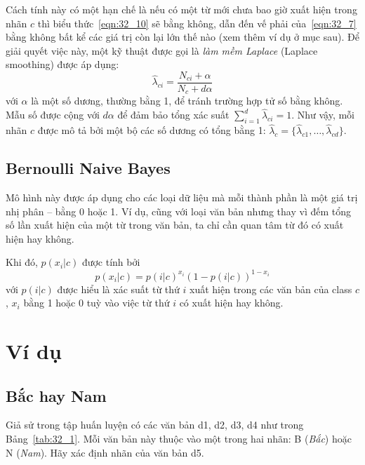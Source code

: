 Cách tính này có một hạn chế là nếu có một từ mới chưa bao giờ xuất hiện trong
nhãn $c$ thì biểu thức~\eqref{eqn:32_10} sẽ bằng không, dẫn đến vế phải
của~\eqref{eqn:32_7} bằng không bất kể các giá trị còn lại lớn thế nào (xem
thêm ví dụ ở mục sau). Để giải quyết việc này, một kỹ thuật được gọi là 
\textit{làm mềm Laplace} (Laplace smoothing) được áp dụng:
\begin{equation} 
\label{eqn:32_11}
\hat{\lambda}_{ci} = \frac{N_{ci} + \alpha}{N_{c} + d\alpha}
\end{equation} 
với $\alpha$ là một số dương, thường bằng 1, để tránh trường hợp tử số bằng
không. Mẫu số được cộng với $d\alpha$ để đảm bảo tổng xác suất $\sum_{i=1}^d
\hat{\lambda}_{ci} = 1$.
 Như vậy, mỗi nhãn $c$ được mô tả bởi một bộ các số dương có tổng bằng 1: $\hat{\lambda}_c = \{\hat{\lambda}_{c1}, \dots, \hat{\lambda}_{cd}\}$.
 
 
\subsection{Bernoulli Naive Bayes }
 
Mô hình này được áp dụng cho các loại dữ liệu mà mỗi thành phần là một giá trị
nhị phân -- bằng 0 hoặc 1. Ví dụ, cũng với loại văn bản nhưng thay vì đếm tổng
số lần xuất hiện của một từ trong văn bản, ta chỉ cần quan tâm từ đó có xuất
hiện hay không.
 
Khi đó, $p(x_i | c) $ được tính bởi
\begin{equation} 
p(x_i | c) = p(i | c)^{x_i}(1 - p(i | c) )^{1 - x_i}
\end{equation} 
với $p(i | c)$ được hiểu là xác suất từ thứ $i$ xuất hiện trong các văn
bản của class $c$, $x_i$ bằng 1 hoặc 0 tuỳ vào việc từ thứ $i$ có xuất hiện hay không.
 
 
 
\section{Ví dụ }
 
 
\subsection{Bắc hay Nam }
Giả sử trong tập huấn luyện có các văn bản d1, d2, d3, d4 như trong Bảng~\ref{tab:32_1}. Mỗi văn bản này thuộc vào một trong hai nhãn: B (\textit{Bắc}) hoặc N (\textit{Nam}). Hãy xác định nhãn của văn bản d5. 

